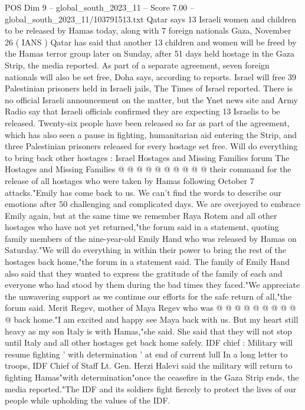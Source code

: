 \begin{textsample}{POS Dim 9 – global\_south\_2023\_11 – Score 7.00 – global\_south\_2023\_11/103791513.txt}  \label{ex:f9_pos_022}
Qatar says 13 Israeli women and children to be released by Hamas today, along with 7 foreign nationals Gaza, November 26 ( IANS ) Qatar has said that another 13 children and women will be freed by the Hamas terror group later on Sunday, after 51 days held hostage in the Gaza Strip, the media reported.
As part of a separate agreement, seven foreign nationals will also be set free, Doha says, according to reports.
Israel will free 39 Palestinian prisoners held in Israeli jails, The Times of Israel reported.
There is no official Israeli announcement on the matter, but the Ynet news site and Army Radio say that Israeli officials confirmed they are expecting 13 Israelis to be released.
Twenty-six people have been released so far as part of the agreement, which has also seen a pause in fighting, humanitarian aid entering the Strip, and three Palestinian prisoners released for every hostage set free.
Will do everything to bring back other hostages : Israel Hostages and Missing Families forum The Hostages and Missing Families @ @ @ @ @ @ @ @ @ @ their command for the release of all hostages who were taken by Hamas following October 7 attacks."Emily has come back to us.
We can't find the words to describe our emotions after 50 challenging and complicated days.
We are overjoyed to embrace Emily again, but at the same time we remember Raya Rotem and all other hostages who have not yet returned,"the forum said in a statement, quoting family members of the nine-year-old Emily Hand who was released by Hamas on Saturday."We will do everything in within their power to bring the rest of the hostages back home,"the forum in a statement said.
The family of Emily Hand also said that they wanted to express the gratitude of the family of each and everyone who had stood by them during the bad times they faced."We appreciate the unwavering support as we continue our efforts for the safe return of all,"the forum said.
Merit Regev, mother of Maya Regev who was @ @ @ @ @ @ @ @ @ @ back home."I am excited and happy see Maya back with us.
But my heart still heavy as my son Italy is with Hamas,"she said.
She said that they will not stop until Italy and all other hostages get back home safely.
IDF chief : Military will resume fighting ' with determination ' at end of current lull In a long letter to troops, IDF Chief of Staff Lt.
Gen.
Herzi Halevi said the military will return to fighting Hamas"with determination"once the ceasefire in the Gaza Strip ends, the media reported."The IDF and its soldiers fight fiercely to protect the lives of our people while upholding the values of the IDF.

\end{textsample}

